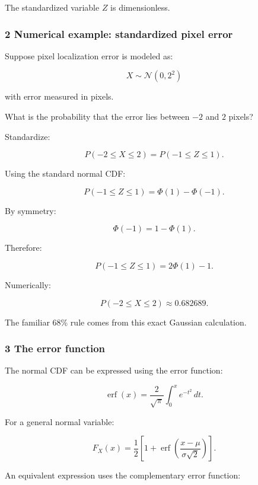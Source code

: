 The standardized variable \(Z\) is dimensionless.

\subsubsection{2 Numerical example: standardized pixel error}\label{02-foundations-ii-ch023-numerical-example-standardized-pixel-error}

\hypertarget{02-foundations-ii-ch023-numerical-example-standardized-pixel-error}{}

Suppose pixel localization error is modeled as:

\[
 X\sim\mathcal N(0,2^2)
\]

with error measured in pixels.

What is the probability that the error lies between \(-2\) and \(2\) pixels?

Standardize:

\[
 P(-2\le X\le2) = P\left(-1\le Z\le1\right).
\]

Using the standard normal CDF:

\[
 P(-1\le Z\le1) = \Phi(1)-\Phi(-1).
\]

By symmetry:

\[
 \Phi(-1)=1-\Phi(1).
\]

Therefore:

\[
 P(-1\le Z\le1) = 2\Phi(1)-1.
\]

Numerically:

\[
 \boxed{P(-2\le X\le2)\approx0.682689}.
\]

The familiar 68\% rule comes from this exact Gaussian calculation.

\subsubsection{3 The error function}\label{02-foundations-ii-ch023-the-error-function}

\hypertarget{02-foundations-ii-ch023-the-error-function}{}

The normal CDF can be expressed using the error function:

\[
 \operatorname{erf}(x)= \frac2{\sqrt\pi} \int_0^xe^{-t^2}\,dt.
\]

For a general normal variable:

\[
 \boxed{ F_X(x) = \frac12\left[ 1+\operatorname{erf} \left(\frac{x-\mu}{\sigma\sqrt2}\right) \right] }.
\]

An equivalent expression uses the complementary error function:

